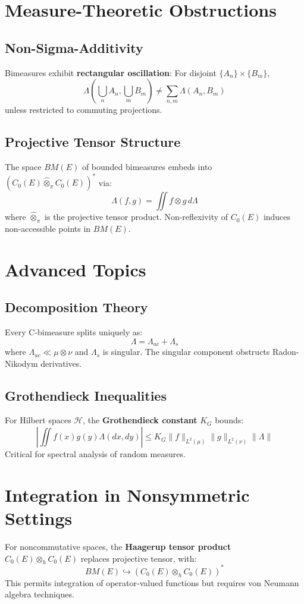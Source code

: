 \documentclass{article}
\begin{document}
\section{Measure-Theoretic Obstructions}

\subsection{Non-Sigma-Additivity}
Bimeasures exhibit \textbf{rectangular oscillation}: For disjoint $\{A_n\} \times \{B_m\}$,
$$
\Lambda\left(\bigcup_n A_n, \bigcup_m B_m\right) \neq \sum_{n,m} \Lambda(A_n, B_m)
$$
unless restricted to commuting projections.

\subsection{Projective Tensor Structure}
The space $BM(E)$ of bounded bimeasures embeds into $(C_0(E) \hat{\otimes}_\pi C_0(E))^*$ via:
$$
\Lambda(f,g) = \iint f \otimes g \, d\Lambda
$$
where $\hat{\otimes}_\pi$ is the projective tensor product. Non-reflexivity of $C_0(E)$ induces non-accessible points in $BM(E)$.

\section{Advanced Topics}

\subsection{Decomposition Theory}
Every C-bimeasure splits uniquely as:
$$
\Lambda = \Lambda_{ac} + \Lambda_s
$$
where $\Lambda_{ac} \ll \mu \otimes \nu$ and $\Lambda_s$ is singular. The singular component obstructs Radon-Nikodym derivatives.

\subsection{Grothendieck Inequalities}
For Hilbert spaces $\mathcal{H}$, the \textbf{Grothendieck constant} $K_G$ bounds:
$$
\left| \iint f(x)g(y) \Lambda(dx, dy) \right| \leq K_G \|f\|_{L^2(\mu)} \|g\|_{L^2(\nu)} \|\Lambda\|
$$
Critical for spectral analysis of random measures.

\section{Integration in Nonsymmetric Settings}
For noncommutative spaces, the \textbf{Haagerup tensor product} $C_0(E) \otimes_h C_0(E)$ replaces projective tensor, with:
$$
BM(E) \hookrightarrow (C_0(E) \otimes_h C_0(E))^*
$$
This permits integration of operator-valued functions but requires von Neumann algebra techniques.
\end{document}
